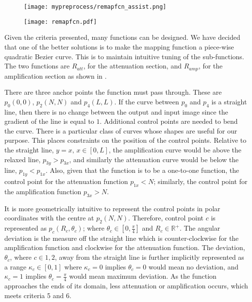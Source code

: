 \begin{figure}[!t]
	\centering
	\begin{minipage}{.5\textwidth}
		\centering
		\texttt{[image: mypreprocess/remapfcn\_assist.png]}
		\label{fig:remapfunctionspace}
	\end{minipage}%
	\begin{minipage}{.5\textwidth}
		\centering
		\texttt{[image: remapfcn.pdf]}
		\label{fig:remapfcn}
	\end{minipage}
\end{figure}


\begin{definition}
	Given the criteria presented, many functions can be designed. We have decided that one of the better solutions is to make the mapping function a piece-wise quadratic Bezier curve. This is to maintain intuitive tuning of the sub-functions. The two functions are $R_{att}$, for the attenuation section, and $R_{amp}$, for the amplification section as shown in .
	
	There are three anchor points the function must pass through. These are $p_0(0,0)$, $p_2(N, N)$ and $p_4(L,L)$. If the curve between $p_0$ and $p_4$ is a straight line, then there is no change between the output and input image since the gradient of the line is equal to $1$. Additional control points are needed to bend the curve.
	There is a particular class of curves whose shapes are useful for our purpose. This places constraints on the position of the control points. Relative to the straight line, $y=x, \, x \in [0,L]$, the amplification curve would be above the relaxed line, $p_{3y} > p_{3x}$, and similarly the attenuation curve would be below the line, $p_{1y} < p_{1x}$. Also, given that the function is to be a one-to-one function, the control point for the attenuation function $p_{1x}<N$; similarly, the control point for the amplification function $p_{3x}>N$.
	
	It is more geometrically intuitive to represent the control points in polar coordinates with the centre at $p_2(N,N)$. Therefore, control point $c$ is represented as $p_c(R_c, \theta_c)$; where $\theta_c \in [0, \frac{\pi}{4}]$ and $R_c \in \mathbb{R}^+$. The angular deviation is the measure off the straight line which is counter-clockwise for the amplification function and clockwise for the attenuation function. The deviation, $\theta_c$, where $c \in {1,2}$, away from the straight line is further implicitly represented as a range $\kappa_c \in [0,1]$ where $\kappa_c=0$ implies $\theta_c = 0$ would mean no deviation, and $\kappa_c = 1$ implies $\theta_c = \frac{\pi}{4}$ would mean maximum deviation.
	As the function approaches the ends of its domain, less attenuation or amplification occurs, which meets criteria 5 and 6.
	

\end{definition}

